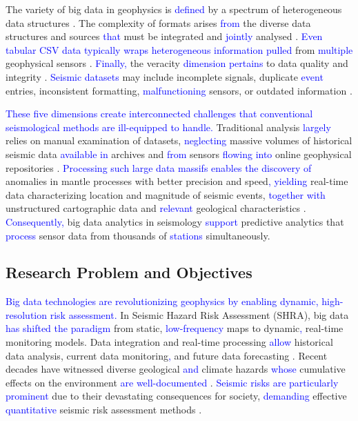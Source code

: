 \documentclass[data,article,submit,pdftex,moreauthors]{Definitions/mdpi}
\begin{document}
The variety of big data in geophysics is \textcolor{blue}{defined} by a spectrum of heterogeneous data structures \cite{li2016big,wang2019geophysical}. The complexity of formats arises \textcolor{blue}{from} the diverse data structures and sources \textcolor{blue}{that} must be integrated and \textcolor{blue}{jointly} analysed \cite{chen2014big}. \textcolor{blue}{Even tabular CSV data typically wraps heterogeneous information pulled} from \textcolor{blue}{multiple} geophysical sensors \cite{ma2015big,kessler2019data}. \textcolor{blue}{Finally,} the veracity \textcolor{blue}{dimension} \textcolor{blue}{pertains} to data quality and integrity \cite{fang2015big,reyes2017data}. \textcolor{blue}{Seismic datasets} may include incomplete signals, duplicate \textcolor{blue}{event} entries, inconsistent formatting, \textcolor{blue}{malfunctioning} sensors, or outdated information \cite{mousavi2019cred}.

\textcolor{blue}{These five dimensions create interconnected challenges that conventional seismological methods are ill-equipped to handle.} Traditional analysis \textcolor{blue}{largely} relies on manual examination of datasets, \textcolor{blue}{neglecting} massive volumes of historical seismic data \textcolor{blue}{available in} archives and \textcolor{blue}{from} sensors \textcolor{blue}{flowing into} online geophysical repositories \cite{kong2019machine}. \textcolor{blue}{Processing such large data massifs enables the discovery of} anomalies in mantle processes with better precision and speed\textcolor{blue}{, yielding} real-time data characterizing location and magnitude of seismic events, \textcolor{blue}{together with} unstructured cartographic data and \textcolor{blue}{relevant} geological characteristics \cite{perol2018convolutional,zhu2019phasenet}. \textcolor{blue}{Consequently,} big data analytics in seismology \textcolor{blue}{support} predictive analytics that \textcolor{blue}{process} sensor data from thousands of \textcolor{blue}{stations} simultaneously.

\subsection{Research Problem and Objectives}

\textcolor{blue}{Big data technologies are revolutionizing geophysics by enabling dynamic, high-resolution risk assessment.} In Seismic Hazard Risk Assessment (SHRA), big data \textcolor{blue}{has shifted the paradigm} from static, \textcolor{blue}{low-frequency} maps to dynamic\textcolor{blue}{,} real-time monitoring models. Data integration and real-time processing \textcolor{blue}{allow} historical data analysis, current data monitoring\textcolor{blue}{,} and future data forecasting \cite{Sen2009}. Recent decades have witnessed diverse geological \textcolor{blue}{and} climate hazards \textcolor{blue}{whose} cumulative effects on the environment \textcolor{blue}{are well-documented} \cite{Liggins2013}. \textcolor{blue}{Seismic risks are particularly prominent} due to their devastating consequences for society, \textcolor{blue}{demanding} effective \textcolor{blue}{quantitative} seismic risk assessment methods \cite{Dowrick2009,Liu2024}.
\end{document}
